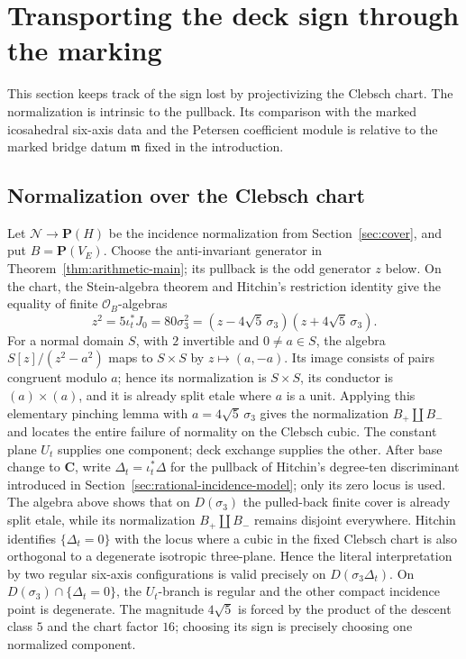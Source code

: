 \section{Transporting the deck sign through the marking}
\label{sec:marked-sheet-transport}

This section keeps track of the sign lost by projectivizing the Clebsch
chart.  The normalization is intrinsic to the pullback.  Its comparison with
the marked icosahedral six-axis data and the Petersen coefficient module is relative to
the marked bridge datum \(\mathfrak m\) fixed in the introduction.

\subsection{Normalization over the Clebsch chart}

Let \(\mathcal N\to\mathbf P(H)\) be the incidence normalization from
Section~\ref{sec:cover}, and put \(B=\mathbf P(V_E)\).  Choose the
anti-invariant generator in Theorem~\ref{thm:arithmetic-main}; its pullback
is the odd generator \(z\) below.  On the chart, the Stein-algebra theorem
and Hitchin's restriction identity give the equality of finite
\(\mathcal O_B\)-algebras
\[
 z^2=5\iota_t^*J_0=80\sigma_3^2
   =(z-4\sqrt5\,\sigma_3)(z+4\sqrt5\,\sigma_3).
\]
For a normal domain \(S\), with \(2\) invertible and \(0\ne a\in S\), the algebra
\(S[z]/(z^2-a^2)\) maps to \(S\times S\) by \(z\mapsto(a,-a)\).  Its image
consists of pairs congruent modulo \(a\); hence its normalization is
\(S\times S\), its conductor is \((a)\times(a)\), and it is already split
etale where \(a\) is a unit.  Applying this elementary pinching lemma with
\(a=4\sqrt5\,\sigma_3\) gives the normalization
\(B_+\amalg B_-\) and locates the entire failure of normality on the
Clebsch cubic.  The constant plane \(U_t\) supplies one component; deck
exchange supplies the other.  After base change to \(\mathbf C\), write
\(\Delta_t=\iota_t^*\Delta\) for the pullback of Hitchin's degree-ten
discriminant introduced in Section~\ref{sec:rational-incidence-model}; only
its zero locus is used.  The algebra above shows that on \(D(\sigma_3)\) the
pulled-back finite cover is already split etale, while its normalization
\(B_+\amalg B_-\) remains disjoint everywhere.  Hitchin
\cite[\S8.2]{HitchinBundles} identifies \(\{\Delta_t=0\}\) with the locus
where a cubic in the fixed Clebsch chart is also orthogonal to a degenerate
isotropic three-plane.  Hence the literal interpretation by two regular
six-axis configurations is valid precisely on \(D(\sigma_3\Delta_t)\).  On
\(D(\sigma_3)\cap\{\Delta_t=0\}\), the \(U_t\)-branch is regular and the
other compact incidence point is degenerate.
The magnitude \(4\sqrt5\) is forced by the product of the descent class
\(5\) and the chart factor \(16\); choosing its sign is precisely choosing
one normalized component.

